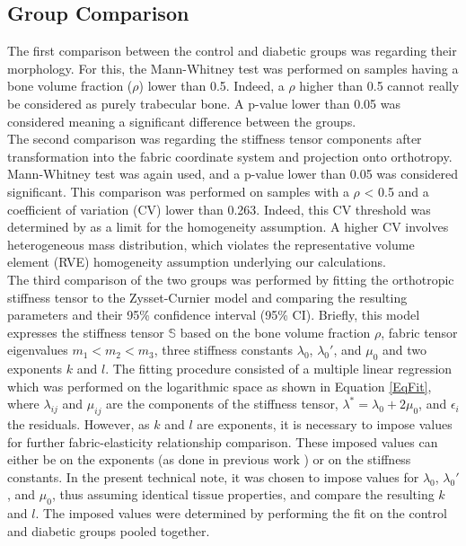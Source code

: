 \documentclass[a4paper,fleqn]{DC_ArtStyle}
\begin{document}
	\subsection{Group Comparison}
	The first comparison between the control and diabetic groups was regarding their morphology.
	For this, the Mann-Whitney test was performed on samples having a bone volume fraction ($\rho$) lower than 0.5.
	Indeed, a $\rho$ higher than 0.5 cannot really be considered as purely trabecular bone.
	A p-value lower than 0.05 was considered meaning a significant difference between the groups.
	\\[0.5em]
	The second comparison was regarding the stiffness tensor components after transformation into the fabric coordinate system and projection onto orthotropy.
	Mann-Whitney test was again used, and a p-value lower than 0.05 was considered significant.
	This comparison was performed on samples with a $\rho$ < 0.5 and a coefficient of variation (CV) lower than 0.263.
	Indeed, this CV threshold was determined by \citeauthor{Panyasantisuk2015} \cite{Panyasantisuk2015} as a limit for the homogeneity assumption.
	A higher CV involves heterogeneous mass distribution, which violates the representative volume element (RVE) homogeneity assumption \cite{Cowin2007} underlying our calculations.
	\\[0.5em]
	The third comparison of the two groups was performed by fitting the orthotropic stiffness tensor to the Zysset-Curnier model \cite{Zysset1995} and comparing the resulting parameters and their 95\% confidence interval (95\% CI).
	Briefly, this model expresses the stiffness tensor $\mathbb{S}$ based on the bone volume fraction $\rho$, fabric tensor eigenvalues $m_1 < m_2 < m_3$, three stiffness constants $\lambda_0$, $\lambda_0'$, and $\mu_0$ and two exponents $k$ and $l$.
	The fitting procedure consisted of a multiple linear regression which was performed on the logarithmic space as shown in Equation \ref{EqFit}, where $\lambda_{ij}$ and $\mu_{ij}$ are the components of the stiffness tensor, $\lambda^{*} = \lambda_0 + 2\mu_0$, and $\epsilon_i$ the residuals.
	However, as $k$ and $l$ are exponents, it is necessary to impose values for further fabric-elasticity relationship comparison.
	These imposed values can either be on the exponents (as done in previous work \cite{Simon2022}) or on the stiffness constants.
	In the present technical note, it was chosen to impose values for $\lambda_0$, $\lambda_0'$, and $\mu_0$, thus assuming identical tissue properties, and compare the resulting $k$ and $l$.
	The imposed values were determined by performing the fit on the control and diabetic groups pooled together.
\end{document}
